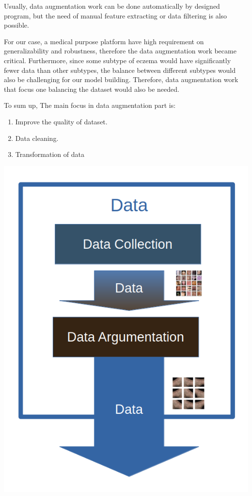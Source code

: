                 Usually, data augmentation work can be done automatically by designed program, but the need of manual feature extracting or data filtering is also possible.

                For our case, a medical purpose platform have high requirement on generalizability and robustness, therefore the data augmentation work became critical. Furthermore, since some subtype of eczema would have significantly fewer data than other subtypes, the balance between different subtypes would also be challenging for our model building. Therefore, data augmentation work that focus one balancing the dataset would also be needed.

                To sum up, The main focus in data augmentation part is:
                \begin{enumerate}
                    \item Improve the quality of dataset.
                    \item Data cleaning.
                    \item Transformation of data
                \end{enumerate}

        \begin{Figure}
            \centering
            \includegraphics[width=\linewidth]{Image/DataWorkflow.png}
        \end{Figure}
